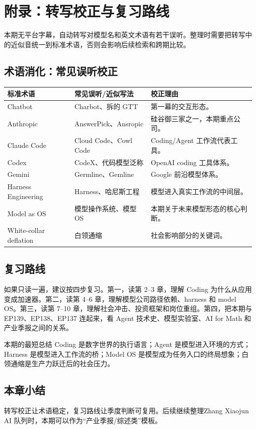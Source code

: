 \section{附录：转写校正与复习路线}

本期无平台字幕，自动转写对模型名和英文术语有若干误听。整理时需要把转写中的近似音统一到标准术语，否则会影响后续检索和跨期比较。

\subsection{术语消化：常见误听校正}

\noindent\begin{longtable}{p{}p{}p{}}
\toprule
标准术语 & 常见误听/近似写法 & 校正理由 \\
\midrule
Chatbot & Charbot、拆的 GTT & 第一幕的交互形态。 \\
Anthropic & AnswerPick、Ansropic & 硅谷御三家之一，本期重点公司。 \\
Claude Code & Cloud Code、Cowl Code & Coding/Agent 工作流代表工具。 \\
Codex & CodeX、代码模型泛称 & OpenAI coding 工具体系。 \\
Gemini & Germline、Gemline & Google 前沿模型体系。 \\
Harness Engineering & Harness、哈尼斯工程 & 模型进入真实工作流的中间层。 \\
Model as OS & 模型操作系统、模型 OS & 本期关于未来模型形态的核心判断。 \\
White-collar deflation & 白领通缩 & 社会影响部分的关键词。 \\
\bottomrule
\end{longtable}

\subsection{复习路线}

如果只读一遍，建议按四步复习。第一，读第 2--3 章，理解 Coding 为什么从应用变成加速器。第二，读第 4--6 章，理解模型公司路径依赖、harness 和 model OS。第三，读第 7--10 章，理解社会冲击、投资框架和岗位重组。第四，把本期与 EP139、EP138、EP137 连起来，看 Agent 技术史、模型实验室、AI for Math 和产业季报之间的关系。

\begin{knowledgebox}{本期的最短总结}
Coding 是数字世界的执行语言；Agent 是模型进入环境的方式；Harness 是模型进入工作流的桥；Model OS 是模型成为任务入口的终局想象；白领通缩是生产力跃迁后的社会压力。
\end{knowledgebox}

\subsection{本章小结}

转写校正让术语稳定，复习路线让季度判断可复用。后续继续整理Zhang Xiaojun AI 队列时，本期可以作为“产业季报/综述类”模板。

